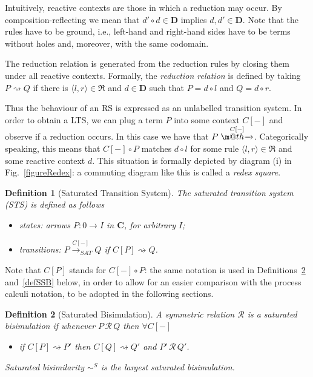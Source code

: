 \documentclass[copyright,creativecommons]{eptcs}
\makeatletter
\def\tr#1{\stackrel{#1}{\to}}
\def\FULLtr#1{\stackrel{#1\ \ }{\rightarrowfill_{SAT}}}
\let\oldrightarrow\to
\renewcommand{\to}[1][]{\ifthenelse{\equal{#1}{}}{\oldrightarrow}{\ensuremath{\xrightarrow{{}_{#1}}}}}
\def \rightarrowfill{\m@th\mathord{\smash-}\mkern-6mu\cleaders\hbox{$\mkern-2mu\mathord{\smash-}\mkern-2mu$}\hfill
  \mkern-6mu\mathord\rightarrow}
\newcommand{\Rules}[1]{\mathfrak{#1}}
\def\tr#1{\stackrel{#1}{\rightarrowfill}}
\def\FULLtr#1{\stackrel{#1\ \ }{\rightarrow_{SAT}}}
\newcommand{\react}{\rightsquigarrow}
\newcommand{\<}{\langle}
\renewcommand{\>}{\rangle}
\def\tr#1{\stackrel{#1}{\rightarrowfill}}
\def \rightarrowfill{\m@th\mathord{\smash-}\mkern-6mu\cleaders\hbox{$\mkern-2mu\mathord{\smash-}\mkern-2mu$}\hfill
  \mkern-6mu\mathord\rightarrow}
\newtheorem{definition}{Definition}{}
\makeatother
\begin{document}
Intuitively, reactive contexts are those in which a reduction may
occur. By composition-reflecting we mean that $d'\circ d \in
\mathbf{D}$ implies $d,d'\in \mathbf{D}$.  Note that the rules have to
be ground, i.e., left-hand and right-hand sides have to be terms
without holes and, moreover, with the same codomain.

The reduction relation is generated from the reduction rules by
closing them under all reactive contexts.  Formally, the
\emph{reduction relation} is defined by taking $P \react Q$ if there
is $\langle l,r \rangle \in\Rules{R}$ and $d\in \mathbf{D}$ such that
$P=d\circ l$ and $Q=d \circ r$.

Thus the behaviour of an RS is expressed as an unlabelled transition
system.
In order to obtain a LTS, we can plug a term $P$ into some context $C[-]$ and observe if a reduction occurs. In this case we have that $P\tr{C[-]}$. Categorically speaking, this means that $C[-] \circ P$ matches $d \circ l$ for some rule $ \langle l,r \rangle\in \Rules{R}$ and some reactive context $d$. This situation is formally depicted by diagram (i) in Fig.~\ref{figureRedex}: a commuting diagram like this is called a \emph{redex square}.

\begin{definition}[Saturated Transition System]
  The \emph{saturated transition system} (STS) is defined as
  follows \begin{itemize} \item states: arrows $P:0\rightarrow I$ in
  $\mathbf{C}$, for arbitrary $I$; \item transitions: $P\FULLtr{C[-]}
  Q$ if $C[P] \react Q$.  \end{itemize}
\end{definition}

Note that $C[P]$ stands for $C[-] \circ P$: the same notation is
used in Definitions~\ref{defSB} and~\ref{defSSB} below, in order to
allow for an easier comparison with the process calculi notation, to
be adopted in the following sections.



\begin{definition}[Saturated Bisimulation]\label{defSB}
A symmetric relation $\mathcal R$ is a \emph{saturated
bisimulation} if whenever $P\, \mathcal R\,Q$ then $\forall C[-]$
\begin{itemize}
\item if $C[P]\react P'$ then $C[Q]\react Q'$ and $P'\,\mathcal R\,Q'$.
\end{itemize}
\emph{Saturated bisimilarity} $\sim^S$ is the largest saturated bisimulation.
\end{definition}
\end{document}
